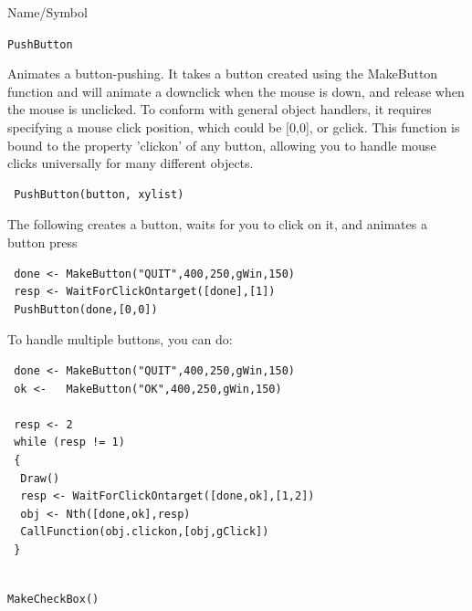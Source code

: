 \begin{desc}{Name/Symbol}
\item[Name/Symbol]  	\verb+PushButton+

\item[Description]	
Animates a button-pushing. It takes a button created using the MakeButton function and will animate a downclick when the mouse is down, and release when the mouse is unclicked.  To conform with general object handlers, it requires specifying a mouse click position, which could be [0,0], or gclick. This function is bound to the property 'clickon' of any button, allowing you to handle mouse clicks universally for many different objects.

\item[Usage]
\begin{verbatim}
 PushButton(button, xylist)
  \end{verbatim}

\item[Example]      	
The following creates a button, waits for you to click on it, and animates a button press

\begin{verbatim}
 done <- MakeButton("QUIT",400,250,gWin,150)
 resp <- WaitForClickOntarget([done],[1])
 PushButton(done,[0,0])
\end{verbatim}

To handle multiple buttons, you can do:

\begin{verbatim}
 done <- MakeButton("QUIT",400,250,gWin,150)
 ok <-   MakeButton("OK",400,250,gWin,150)

 resp <- 2
 while (resp != 1)
 {
  Draw()
  resp <- WaitForClickOntarget([done,ok],[1,2])
  obj <- Nth([done,ok],resp)
  CallFunction(obj.clickon,[obj,gClick])
 } 
 
\end{verbatim}


\item[See Also]	\verb+MakeCheckBox()+
\end{desc}


